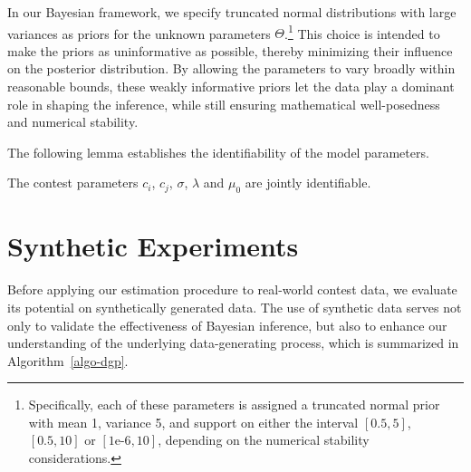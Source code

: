 \documentclass[mnsc]{informs3}
\begin{document}
In our Bayesian framework, we specify truncated normal distributions with large variances as priors for the unknown parameters $\Theta$.\footnote{Specifically, each of these parameters is assigned a truncated normal prior with mean 1, variance 5, and support on either the interval $[0.5, 5]$, $[0.5, 10]$ or $[\text{1e-6}, 10]$, depending on the numerical stability considerations.}
This choice is intended to make the priors as uninformative as possible, thereby minimizing their influence on the posterior distribution. 
By allowing the parameters to vary broadly within reasonable bounds, these weakly informative priors let the data play a dominant role in shaping the inference, while still ensuring mathematical well-posedness and numerical stability.

The following lemma establishes the identifiability of the model parameters.

\begin{lemma}\label{lmm-params-identifiability}
The contest parameters $c_i$, $c_j$, $\sigma$, $\lambda$ and $\mu_0$ are jointly identifiable. 
\end{lemma}




\section{Synthetic Experiments}

Before applying our estimation procedure to real-world contest data, we evaluate its potential on synthetically generated data. 
The use of synthetic data serves not only to validate the effectiveness of Bayesian inference, but also to enhance our understanding of the underlying data-generating process, which is summarized in Algorithm~\ref{algo-dgp}. 
\end{document}
